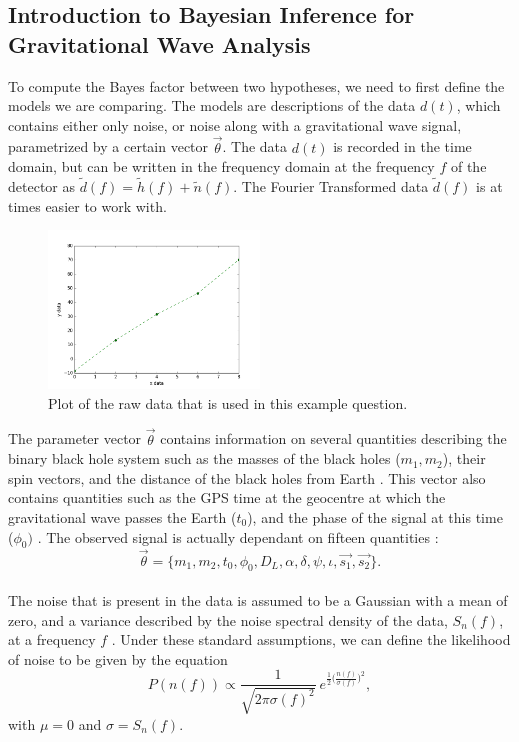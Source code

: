 \documentclass{article}
\begin{document}
 \subsection{Introduction to Bayesian Inference for Gravitational Wave Analysis}
 \label{section:introToBayes}
 
To compute the Bayes factor between two hypotheses, we need to first define the models we are comparing. The models are descriptions of the data $d(t)$, which contains either only noise, or noise along with a gravitational wave signal, parametrized by a certain vector $\vec{\theta}$. The data $d(t)$ is recorded in the time domain, but can be written in the frequency domain at the frequency $f$ of the detector as $\tilde{d}(f)= \tilde{h}(f)+\tilde{n}(f).$ The Fourier Transformed data $\tilde{d}(f)$ is at times easier to work with. \\

\begin{figure}[h]
	\centering
	\includegraphics[width=0.5\textwidth]{Figures/rawData.png}
	\caption{Plot of the raw data that is used in this example question.}
	\label{Fig:Detection}
\end{figure}


The parameter vector $\vec{\theta}$ contains information on several quantities describing the binary black hole system such as the masses of the black holes ($m_1, m_2$), their spin vectors, and the distance of the black holes from Earth \cite{BaeStats}. This vector also contains quantities such as the GPS time at the geocentre at which the gravitational wave passes the Earth ($t_0$), and the phase of the signal at this time ($\phi_0)$ \cite{BaeStats}. The observed signal is actually dependant on fifteen quantities \cite{BaeStats}:
$$\vec{\theta} = \{ m_1, m_2, t_0, \phi_0, D_L, \alpha, \delta, \psi, \iota, \vec{s_1}, \vec{s_2} \}. $$
$\text{ }$\\
 The noise that is present in the data is assumed to be a Gaussian with a mean of zero, and a variance described by the noise spectral density of the data, $S_n (f)$, at a frequency $f$ \cite{BaeStats}. Under these standard assumptions, we can define the likelihood of noise to be given by the equation
  \begin{equation} \label{eq:noise}
 P(n(f)) \propto \frac{1}{\sqrt{2 \pi \sigma(f)^2} } \ e^{\frac{1}{2} \big(\frac{n(f)}{\sigma(f)}\big)^2},
  \end{equation}
  \noindent with $\mu = 0$ and $\sigma  = S_n (f)$.\\
 
\end{document}
